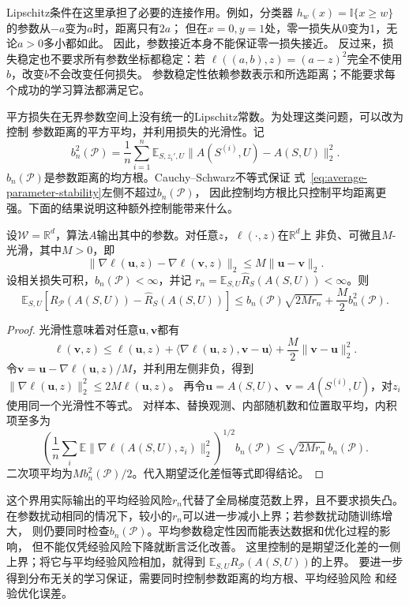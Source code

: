 Lipschitz条件在这里承担了必要的连接作用。例如，分类器
$h_w(x)=\mathbb I\{x\geq w\}$的参数从$-a$变为$a$时，距离只有$2a$；
但在$x=0,y=1$处，零一损失从0变为1，无论$a>0$多小都如此。
因此，参数接近本身不能保证零一损失接近。
反过来，损失稳定也不要求所有参数坐标都稳定：若
$\ell((a,b),z)=(a-z)^2$完全不使用$b$，改变$b$不会改变任何损失。
参数稳定性依赖参数表示和所选距离；不能要求每个成功的学习算法都满足它。

平方损失在无界参数空间上没有统一的Lipschitz常数。为处理这类问题，可以改为控制
参数距离的平方平均，并利用损失的光滑性。记
\[
 b_n^2(\mathcal P)
 =\frac1n\sum_{i=1}^n\mathbb E_{S,z_i',U}
       \|A(S^{(i)},U)-A(S,U)\|_2^2.
\]
$b_n(\mathcal P)$是参数距离的均方根。Cauchy--Schwarz不等式保证
式~\eqref{eq:average-parameter-stability}左侧不超过$b_n(\mathcal P)$，
因此控制均方根比只控制平均距离更强。下面的结果说明这种额外控制能带来什么。

\begin{theorem}[光滑损失下参数稳定性与期望泛化差]
\label{thm:smooth-parameter-generalization}
设$\mathcal W=\mathbb R^d$，算法$A$输出其中的参数。对任意$z$，$\ell(\cdot,z)$在$\mathbb R^d$上
非负、可微且$M$-光滑，其中$M>0$，即
\[
 \|\nabla\ell(\bm u,z)-\nabla\ell(\bm v,z)\|_2
 \leq M\|\bm u-\bm v\|_2.
\]
设相关损失可积，$b_n(\mathcal P)<\infty$，并记
$r_n=\mathbb E_{S,U}\hat R_S(A(S,U))<\infty$。则
\begin{equation}
 \mathbb E_{S,U}[R_{\mathcal P}(A(S,U))-\hat R_S(A(S,U))]
 \leq b_n(\mathcal P)\sqrt{2Mr_n}+\frac M2 b_n^2(\mathcal P).
 \label{eq:smooth-parameter-generalization}
\end{equation}
\end{theorem}
\begin{proof}
光滑性意味着对任意$\bm u,\bm v$都有
\[
 \ell(\bm v,z)\leq\ell(\bm u,z)
 +\langle\nabla\ell(\bm u,z),\bm v-\bm u\rangle
 +\frac M2\|\bm v-\bm u\|_2^2.
\]
令$\bm v=\bm u-\nabla\ell(\bm u,z)/M$，并利用左侧非负，得到
$\|\nabla\ell(\bm u,z)\|_2^2\leq2M\ell(\bm u,z)$。
再令$\bm u=A(S,U)$、$\bm v=A(S^{(i)},U)$，对$z_i$使用同一个光滑性不等式。
对样本、替换观测、内部随机数和位置取平均，内积项至多为
\[
 \left(\frac1n\sum_i\mathbb E\|\nabla\ell(A(S,U),z_i)\|_2^2\right)^{1/2}
 b_n(\mathcal P)
 \leq\sqrt{2Mr_n}\,b_n(\mathcal P).
\]
二次项平均为$Mb_n^2(\mathcal P)/2$。代入期望泛化差恒等式即得结论。
\end{proof}

这个界用实际输出的平均经验风险$r_n$代替了全局梯度范数上界，且不要求损失凸。
在参数扰动相同的情况下，较小的$r_n$可以进一步减小上界；若参数扰动随训练增大，
则仍要同时检查$b_n(\mathcal P)$。平均参数稳定性因而能表达数据和优化过程的影响，
但不能仅凭经验风险下降就断言泛化改善。
这里控制的是期望泛化差的一侧上界；将它与平均经验风险相加，就得到
$\mathbb E_{S,U}R_{\mathcal P}(A(S,U))$的上界。
要进一步得到分布无关的学习保证，需要同时控制参数距离的均方根、平均经验风险
和经验优化误差。

